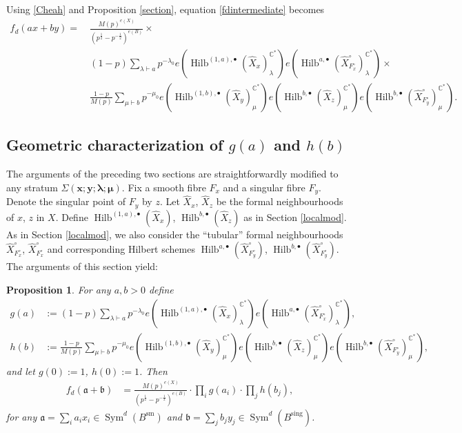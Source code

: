 \documentclass{amsart}
\newtheorem{proposition}[theorem]{Proposition}
\theoremstyle{definition}
\newcommand{\CC} {\mathbb{C}}          %
\newcommand{\Sym}{\operatorname{Sym}}
\newcommand{\Hilb}{\operatorname{Hilb}}
\newcommand{\sm}{\operatorname{sm}}
\newcommand{\sing}{\operatorname{sing}}
\begin{document}
Using \eqref{Cheah} and Proposition \ref{section}, equation \eqref{fdintermediate} becomes
\begin{align*}
f_d(ax+by) = \ &\frac{M(p)^{e(X)}}{(p^{\frac{1}{2}}-p^{-\frac{1}{2}})^{e(B)}} \times \\
&(1-p) \sum_{\lambda \vdash a} p^{-\lambda_0} e(\Hilb^{(1,a),\bullet}(\widehat{X}_x)_{\lambda}^{\CC^*}) e(\Hilb^{a,\bullet}(\widehat{X}^{\circ}_{F_{x}^{\circ}})_{\lambda}^{\CC^*}) \times \\
&\frac{1-p}{M(p)} \sum_{\mu \vdash b} p^{-\mu_0} e(\Hilb^{(1,b),\bullet}(\widehat{X}_y)_{\mu}^{\CC^*}) e(\Hilb^{b,\bullet}(\widehat{X}_z)_{\mu}^{\CC^*}) e(\Hilb^{b,\bullet}(\widehat{X}^{\circ}_{F_{y}^{\circ}})_{\mu}^{\CC^*}).
\end{align*}

   
\subsection{Geometric characterization of $g(a)$ and $h(b)$} \label{chargh}

The arguments of the preceding two sections are straightforwardly modified to any stratum $\Sigma(\boldsymbol{x};\boldsymbol{y};\boldsymbol{\lambda};\boldsymbol{\mu})$. Fix a smooth fibre $F_x$ and a singular fibre $F_y$. Denote the singular point of $F_y$ by $z$. Let $\widehat{X}_x$, $\widehat{X}_z$ be the formal neighbourhoods of $x$, $z$ in $X$. Define $\Hilb^{(1,a),\bullet}(\widehat{X}_x)$, $\Hilb^{b,\bullet}(\widehat{X}_z)$ as in Section \ref{localmod}. As in Section \ref{localmod}, we also consider the ``tubular'' formal neighbourhoods $\widehat{X}^{\circ}_{F_{x}^{\circ}}$, $\widehat{X}^{\circ}_{F_{x}^{\circ}}$ and corresponding Hilbert schemes $\Hilb^{a,\bullet}(\widehat{X}^{\circ}_{F_{y}^{\circ}})$, $\Hilb^{b,\bullet}(\widehat{X}^{\circ}_{F_{y}^{\circ}})$. The arguments of this section yield:
\begin{proposition} \label{geomgh}
For any $a,b>0$ define
\begin{align*}
g(a) &:= (1-p) \sum_{\lambda \vdash a} p^{-\lambda_0} e(\Hilb^{(1,a),\bullet}(\widehat{X}_x)_{\lambda}^{\CC^*}) e(\Hilb^{a,\bullet}(\widehat{X}^{\circ}_{F_{x}^{\circ}})_{\lambda}^{\CC^*}), \\
h(b) &:= \frac{1-p}{M(p)} \sum_{\mu \vdash b} p^{-\mu_0} e(\Hilb^{(1,b),\bullet}(\widehat{X}_y)_{\mu}^{\CC^*}) e(\Hilb^{b,\bullet}(\widehat{X}_z)_{\mu}^{\CC^*}) e(\Hilb^{b,\bullet}(\widehat{X}^{\circ}_{F_{y}^{\circ}})_{\mu}^{\CC^*}),
\end{align*}
and let $g(0) := 1$, $h(0) :=1$. Then
\begin{align*}
f_{d}(\mathfrak{a} + \mathfrak{b}) &= \frac{M(p)^{e(X)}}{(p^{\frac{1}{2}}-p^{-\frac{1}{2}})^{e(B)}} \cdot \prod_{i} g(a_i) \cdot \prod_{j} h(b_j), 
\end{align*}
for any $\mathfrak{a} = \sum_i a_i x_i \in \Sym^{d}(B^{\sm})$ and $\mathfrak{b} = \sum_j b_j y_j \in \Sym^{d}(B^{\sing})$.
\end{proposition}
   
\end{document}
